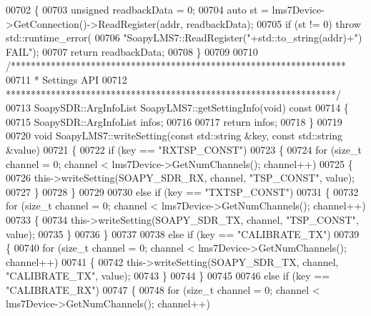 \begin{DoxyCode}
{{{{{{{{{{{{{{00702 \textcolor{keyword}{}\{
00703     \textcolor{keywordtype}{unsigned} readbackData = 0;
00704     \textcolor{keyword}{auto} st = lms7Device->GetConnection()->ReadRegister(addr, readbackData);
00705     \textcolor{keywordflow}{if} (st != 0) \textcolor{keywordflow}{throw} std::runtime\_error(
00706         \textcolor{stringliteral}{"SoapyLMS7::ReadRegister("}+std::to\_string(addr)+\textcolor{stringliteral}{") FAIL"});
00707     \textcolor{keywordflow}{return} readbackData;
00708 \}
00709 
00710 \textcolor{comment}{/*******************************************************************}
00711 \textcolor{comment}{ * Settings API}
00712 \textcolor{comment}{ ******************************************************************/}
00713 SoapySDR::ArgInfoList SoapyLMS7::getSettingInfo(\textcolor{keywordtype}{void})\textcolor{keyword}{ const}
00714 \textcolor{keyword}{}\{
00715     SoapySDR::ArgInfoList infos;
00716 
00717     \textcolor{keywordflow}{return} infos;
00718 \}
00719 
00720 \textcolor{keywordtype}{void} SoapyLMS7::writeSetting(\textcolor{keyword}{const} std::string &key, \textcolor{keyword}{const} std::string &value)
00721 \{
00722     \textcolor{keywordflow}{if} (key == \textcolor{stringliteral}{"RXTSP\_CONST"})
00723     \{
00724         \textcolor{keywordflow}{for} (\textcolor{keywordtype}{size\_t} channel = 0; channel < lms7Device->GetNumChannels(); channel++)
00725         \{
00726             this->writeSetting(SOAPY_SDR_RX, channel, \textcolor{stringliteral}{"TSP\_CONST"}, value);
00727         \}
00728     \}
00729 
00730     \textcolor{keywordflow}{else} \textcolor{keywordflow}{if} (key == \textcolor{stringliteral}{"TXTSP\_CONST"})
00731     \{
00732         \textcolor{keywordflow}{for} (\textcolor{keywordtype}{size\_t} channel = 0; channel < lms7Device->GetNumChannels(); channel++)
00733         \{
00734             this->writeSetting(SOAPY_SDR_TX, channel, \textcolor{stringliteral}{"TSP\_CONST"}, value);
00735         \}
00736     \}
00737 
00738     \textcolor{keywordflow}{else} \textcolor{keywordflow}{if} (key == \textcolor{stringliteral}{"CALIBRATE\_TX"})
00739     \{
00740         \textcolor{keywordflow}{for} (\textcolor{keywordtype}{size\_t} channel = 0; channel < lms7Device->GetNumChannels(); channel++)
00741         \{
00742             this->writeSetting(SOAPY_SDR_TX, channel, \textcolor{stringliteral}{"CALIBRATE\_TX"}, value);
00743         \}
00744     \}
00745 
00746     \textcolor{keywordflow}{else} \textcolor{keywordflow}{if} (key == \textcolor{stringliteral}{"CALIBRATE\_RX"})
00747     \{
00748         \textcolor{keywordflow}{for} (\textcolor{keywordtype}{size\_t} channel = 0; channel < lms7Device->GetNumChannels(); channel++)
}}}}}}}}}}}}}}
\end{DoxyCode}
